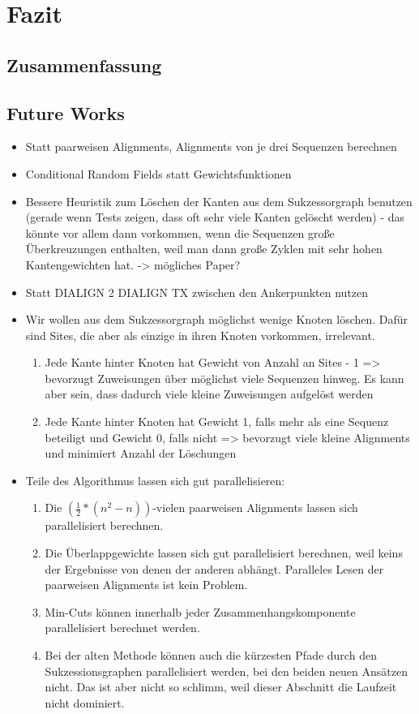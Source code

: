 \chapter{Fazit}
\label{ch:fazit}

\section{Zusammenfassung}

\section{Future Works}

\begin{itemize}
	\item Statt paarweisen Alignments, Alignments von je drei Sequenzen berechnen
	\item Conditional Random Fields statt Gewichtsfunktionen
	\item Bessere Heuristik zum Löschen der Kanten aus dem Sukzessorgraph benutzen (gerade wenn Tests zeigen, dass oft sehr viele Kanten gelöscht werden) - das könnte vor allem dann vorkommen, wenn die Sequenzen große Überkreuzungen enthalten, weil man dann große Zyklen mit sehr hohen Kantengewichten hat. -> mögliches Paper?
	\item Statt DIALIGN 2 DIALIGN TX zwischen den Ankerpunkten nutzen
	\item Wir wollen aus dem Sukzessorgraph möglichst wenige Knoten löschen. Dafür sind Sites, die aber als einzige in ihren Knoten vorkommen, irrelevant. 
		\begin{enumerate}
			\item Jede Kante hinter Knoten hat Gewicht von Anzahl an Sites - 1 => bevorzugt Zuweisungen über möglichst viele Sequenzen hinweg. Es kann aber sein, dass dadurch viele kleine Zuweisungen aufgelöst werden
			\item Jede Kante hinter Knoten hat Gewicht 1, falls mehr als eine Sequenz beteiligt und Gewicht 0, falls nicht => bevorzugt viele kleine Alignments und minimiert Anzahl der Löschungen
		\end{enumerate}
	\item Teile des Algorithmus lassen sich gut parallelisieren:
		\begin{enumerate}
			\item Die $(\frac{1}{2}*(n^2-n))$-vielen paarweisen Alignments lassen sich parallelisiert berechnen.
			\item Die Überlappgewichte lassen sich gut parallelisiert berechnen, weil keins der Ergebnisse von denen der anderen abhängt. Paralleles Lesen der paarweisen Alignments ist kein Problem.
			\item Min-Cuts können innerhalb jeder Zusammenhangskomponente parallelisiert berechnet werden.
			\item Bei der alten Methode können auch die kürzesten Pfade durch den Sukzessionsgraphen parallelisiert werden, bei den beiden neuen Ansätzen nicht. Das ist aber nicht so schlimm, weil dieser Abschnitt die Laufzeit nicht dominiert.
		\end{enumerate}
\end{itemize}